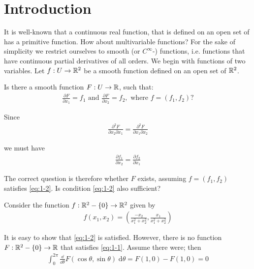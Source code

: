 \chapter{Introduction}
It is well-known that a continuous real function, that is defined on an open set of
\RR{} has a primitive function. How about multivariable functions? For the sake of
simplicity we restrict ourselves to smooth (or $C^\infty$-) functions, i.e. functions that
have continuous partial derivatives of all orders.
We begin with functions of two variables. Let $f:U\to {\ensuremath{\mathbb{R}}}^2$ be a smooth function
defined on an open set of ${\mathbb{R}}^2$.

\begin{question}\label{question:1-1}
Is there a smooth function $F:U\to {\ensuremath{\mathbb{R}}}$, such that:
\begin{align}
  \frac{\partial F }{\partial x_1 } = f_1 \text{ and }
  \frac{\partial F }{\partial x_2 } = f_2, \text{ where } 
  f = (f_1, f_2)?
  \label{eq:1-1}
\end{align}

Since
\begin{align*}
  \frac{\partial ^2 F }{\partial x_2\partial x_1 } = 
  \frac{\partial ^2 F }{\partial x_1\partial x_2 }
\end{align*}

we must have 
\begin{align}
  \frac{\partial f_1 }{\partial x_2 } = \frac{\partial f_2 }{\partial x_1}
  \label{eq:1-2}
\end{align}

The correct question is therefore whether $F$ exists, assuming $f = (f_1, f_2)$ satisfies
\eqref{eq:1-2}. Is condition \eqref{eq:1-2} also sufficient?
\end{question}


\begin{example}\label{example:1-2}
Consider the function $f:{\mathbb{R}}^2-\{0\} \to {\ensuremath{\mathbb{R}}}^2$ given by
\begin{align*}
  f(x_1, x_2) = \left(\frac{-x_2}{x_1^2 +x_2^2}, \frac{x_1}{x_1^2 +x_2^2}\right)
\end{align*}
\end{example}

It is easy to show that \eqref{eq:1-2} is satisfied. However, there is no function $F:{\mathbb{R}}^2-\{0\}\to {\ensuremath{\mathbb{R}}}$
that satisfies \eqref{eq:1-1}. Assume there were; then
\begin{align*}
  \int_{0}^{2\pi}{\frac{\dd }{\dd\theta} F(\cos\theta, \sin\theta)\;\mathrm{d}\theta}
  = F(1, 0) - F(1, 0) = 0
\end{align*}

